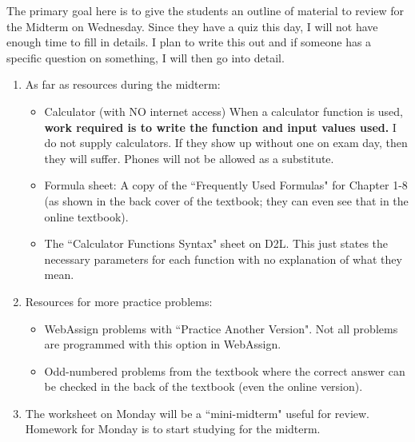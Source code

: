 \documentclass{article}
\begin{document}
The primary goal here is to give the students an outline of material to review for the Midterm on Wednesday. Since they have a quiz this day, I will not have enough time to fill in details. I plan to write this out and if someone has a specific question on something, I will then go into detail.

\begin{enumerate}

    \item As far as resources during the midterm:
        
        \begin{itemize}
        
            \item Calculator (with NO internet access) When a calculator function is used, \textbf{work required is to write the function and input values used.} I do not supply calculators. If they show up without one on exam day, then they will suffer. Phones will not be allowed as a substitute.
            
            \item Formula sheet: A copy of the ``Frequently Used Formulas" for Chapter 1-8 (as shown in the back cover of the textbook; they can even see that in the online textbook).
            
            \item The ``Calculator Functions Syntax" sheet on D2L. This just states the necessary parameters for each function with no explanation of what they mean.
            
        \end{itemize}
        
    \item Resources for more practice problems:
        
        \begin{itemize}
        
            \item WebAssign problems with ``Practice Another Version".  Not all problems are programmed with this option in WebAssign.
            
            \item Odd-numbered problems from the textbook where the correct answer can be checked in the back of the textbook (even the online version).
            
        \end{itemize}
    
    \item The worksheet on Monday will be a ``mini-midterm" useful for review. Homework for Monday is to start studying for the midterm.
    
\end{enumerate}
\end{document}
